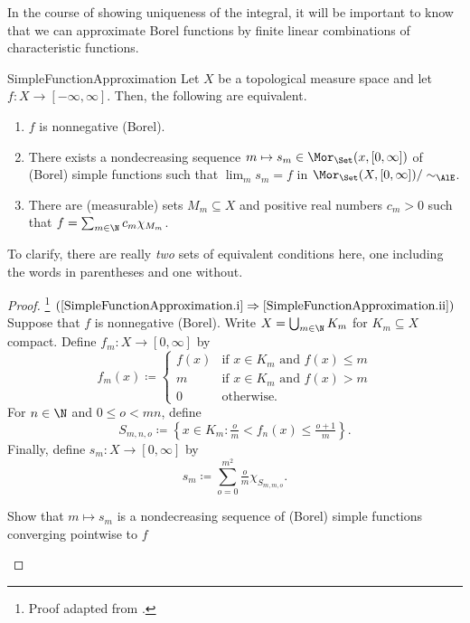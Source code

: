 In the course of showing uniqueness of the integral, it will be important to know that we can approximate Borel functions by finite linear combinations of characteristic functions.
\begin{prp}{}{SimpleFunctionApproximation}
Let $X$ be a topological measure space and let $f\colon X\rightarrow [-
\infty ,\infty ]$.  Then, the following are equivalent.
\begin{enumerate}
\item \label{SimpleFunctionApproximation.i}$f$ is nonnegative (Borel).
\item \label{SimpleFunctionApproximation.ii}There exists a nondecreasing sequence $m\mapsto s_m\in \Mor _{\Set}(x,[0,\infty ])$ of (Borel) simple functions such that $\lim _ms_m=f$ in $\Mor _{\Set}(X,[0,\infty ])/\sim _{\AlE}$.
\item \label{SimpleFunctionApproximation.iii}There are (measurable) sets $M_m\subseteq X$ and positive real numbers $c_m>0$ such that $f=\sum _{m\in \N}c_m\chi _{M_m}$.
\end{enumerate}
\begin{rmk}
To clarify, there are really \emph{two} sets of equivalent conditions here, one including the words in parentheses and one without.
\end{rmk}
\begin{proof}\footnote{Proof adapted from \cite[pg.~31]{Stein}.}
$(\cref{SimpleFunctionApproximation.i}\Rightarrow \cref{SimpleFunctionApproximation.ii})$ Suppose that $f$ is nonnegative (Borel).  Write $X=\bigcup _{m\in \N}K_m$ for $K_m\subseteq X$ compact.  Define $f_m:X\rightarrow [0,\infty ]$ by
\begin{equation}
f_m(x)\coloneqq \begin{cases}f(x) & \text{if }x\in K_m\text{ and }f(x)\leq m \\ m & \text{if }x\in K_m\text{ and }f(x)>m \\ 0 & \text{otherwise.}\end{cases}
\end{equation}
For $n\in \N$ and $0\leq o<mn$, define
\begin{equation}
S_{m,n,o}\coloneqq \left\{ x\in K_m:\tfrac{o}{m}<f_n(x)\leq \tfrac{o+1}{m}\right\} .
\end{equation}
Finally, define $s_m:X\rightarrow [0,\infty ]$ by
\begin{equation}
s_m\coloneqq \sum _{o=0}^{m^2}\tfrac{o}{m}\chi _{S_{m,m,o}}.
\end{equation}
\begin{exr}[breakable=false]{}{}
Show that $m\mapsto s_m$ is a nondecreasing sequence of (Borel) simple functions converging pointwise to $f$
\end{exr}


\end{proof}
\end{prp}
